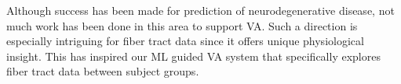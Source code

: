 



Although success has been made for prediction of  neurodegenerative disease, not much work has been done in this area to support VA. Such a direction is especially intriguing for fiber tract data since it offers unique physiological insight.%
This has inspired our ML guided VA system that specifically explores fiber tract data between subject groups. 



